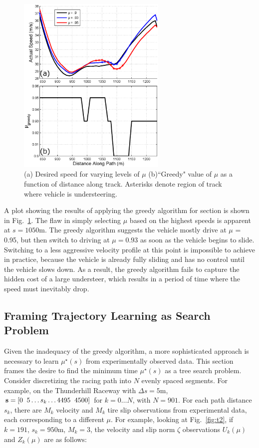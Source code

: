 \documentclass[9pt,shortpaper,twoside,web]{ieeecolor}
\newcommand*\circled[1]{\tikz[baseline=(char.base)]{
            \node[shape=circle,draw,inner sep=2pt] (char) {#1};}}
\begin{document}
{{{ \begin{figure}[tb]
\centering
\includegraphics[width=2.8in]{figures/turn2greedy.eps}
\caption[Greedy algorithm results for region 2.]{(a) Desired speed for varying levels of $\mu$ (b)``Greedy" value of $\mu$ as a function of distance along track. Asterisks denote
region of track where vehicle is understeering.}
\label{fig:t2g}
\end{figure}

A plot showing the results of applying the greedy algorithm for section \circled{2} is shown in Fig.~\ref{fig:t2g}. The flaw in simply
selecting $\mu$ based on the highest speeds is apparent at $s = 1050 \mathrm{m}$. The greedy algorithm suggests the vehicle mostly drive at $\mu$ = 0.95,
but then switch to driving at $\mu = 0.93$ as soon as the vehicle begins to slide. Switching to a less aggressive velocity profile at this
point is impossible to achieve in practice, because the vehicle is already fully sliding and has no control until the vehicle slows down.
As a result, the greedy algorithm fails to capture the hidden cost of a large understeer, which results in a period of time where the speed must
inevitably drop. 

\subsection{Framing Trajectory Learning as Search Problem}
\label{sec:framingTL}

Given the inadequacy of the greedy algorithm, a more sophisticated approach is necessary to learn $\mu^\star(s)$ from
experimentally observed data. This section frames the desire to find the minimum time $\mu^\star(s)$ as a tree search problem.
Consider discretizing the racing path into $N$ evenly spaced segments. For example, on the Thunderhill Raceway with
$\Delta s = 5 \mathrm{m}$, $\textbf{s} = [0 \hspace{2mm} 5 \hdots s_k \hdots 4495 \hspace{2mm} 4500]$ for $k = 0 \hdots N$, with $N = 901$. For each
path distance $s_k$, there are $M_k$ velocity and $M_k$ tire slip observations from experimental data, each corresponding to a different $\mu$. 
For example, looking at Fig.~\ref{fig:t2}, if $k = 191$, $s_k =  950 \mathrm{m}$, $M_k = 3$, the velocity and slip norm $\zeta$ observations $U_k(\mu)$ and $Z_k(\mu)$ are as follows:

}}}
\end{document}
